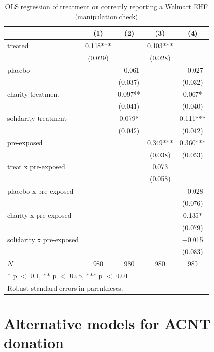 \documentclass[
  11pt,
  oneside]{article}
\begin{document}
\begin{table}
\centering
\caption{\label{tab:setup}OLS regression of treatment on correctly reporting a Walmart EHF (manipulation check) \label{tab:tab-manip-check}}
\centering
\begin{tabular}[t]{lcccc}
\toprule
  & (1) & (2) & (3) & (4)\\
\midrule
treated & \num{0.118}*** &  & \num{0.103}*** & \\
 & (\num{0.029}) &  & (\num{0.028}) & \\
placebo &  & \num{-0.061} &  & \num{-0.027}\\
 &  & (\num{0.037}) &  & (\num{0.032})\\
charity treatment &  & \num{0.097}** &  & \num{0.067}*\\
 &  & (\num{0.041}) &  & (\num{0.040})\\
solidarity treatment &  & \num{0.079}* &  & \num{0.111}***\\
 &  & (\num{0.042}) &  & (\num{0.042})\\
pre-exposed &  &  & \num{0.349}*** & \num{0.360}***\\
 &  &  & (\num{0.038}) & (\num{0.053})\\
treat x pre-exposed &  &  & \num{0.073} & \\
 &  &  & (\num{0.058}) & \\
placebo x pre-exposed &  &  &  & \num{-0.028}\\
 &  &  &  & (\num{0.076})\\
charity x pre-exposed &  &  &  & \num{0.135}*\\
 &  &  &  & (\num{0.079})\\
solidarity x pre-exposed &  &  &  & \num{-0.015}\\
 &  &  &  & (\num{0.083})\\
\midrule
$N$ & \num{980} & \num{980} & \num{980} & \num{980}\\
\bottomrule
\multicolumn{5}{l}{\rule{0pt}{1em}* p $<$ 0.1, ** p $<$ 0.05, *** p $<$ 0.01}\\
\multicolumn{5}{l}{\rule{0pt}{1em}Robust standard errors in parentheses.}\\
\end{tabular}
\end{table}

\FloatBarrier

\section{Alternative models for ACNT donation}\label{app-wmt-altdonate}
\end{document}
